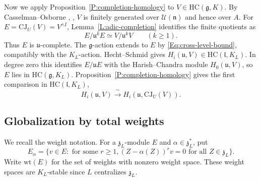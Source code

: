\documentclass[a4paper,12pt]{amsart}
\numberwithin{equation}{section}
\theoremstyle{plain}
\theoremstyle{definition}
\theoremstyle{remark}
\newcommand{\HC}{\mathrm{HC}}
\begin{document}
Now we apply Proposition~\ref{P:completion-homology} to $V\in\HC(\mathfrak g,K)$.
By Casselman--Osborne \cite{Casselman-Osborne}, \cite[Lemma~2.22]{HS83}, $V$ is finitely generated over $\mathcal U(\mathfrak n)$ and hence over $A$.
For $E=\mathrm{CJ}_U(V)=V^{\wedge I}$, Lemma~\ref{L:adic-completion} identifies the finite quotients as
\begin{equation}\label{Eq:CJ-algebraic-levels}
 E/\mathfrak u^kE\simeq V/\mathfrak u^kV\qquad(k\geq1).
\end{equation}
Thus $E$ is $\mathfrak u$-complete.
The $\mathfrak g$-action extends to $E$ by \eqref{Eq:cross-level-bound}, compatibly with the $K_L$-action.
Hecht--Schmid \cite[Proposition~2.24]{HS83} gives $H_i(\mathfrak u,V)\in\HC(\mathfrak l,K_L)$.
In degree zero this identifies $E/\mathfrak uE$ with the Harish--Chandra module $H_0(\mathfrak u,V)$, so $E$ lies in $\HC(\mathfrak g,K_L)$.
Proposition~\ref{P:completion-homology} gives the first comparison in $\HC(\mathfrak l,K_L)$,
\begin{equation}\label{Eq:algebraic-comparison}
 H_i(\mathfrak u,V)\xrightarrow{\ \sim\ }H_i(\mathfrak u,\mathrm{CJ}_U(V)).
\end{equation}

\subsection{Globalization by total weights}\label{S:complete-homology}
We recall the weight notation.
For a $\mathfrak z_L$-module $E$ and $\alpha\in\mathfrak z_L^*$, put
\[
 E_\alpha=\{v\in E:\text{ for some }r\geq1,
       (Z-\alpha(Z))^rv=0\text{ for all }Z\in\mathfrak z_L\}.
\]
Write $\mathrm{wt}(E)$ for the set of weights with nonzero weight space.
These weight spaces are $K_L$-stable since $L$ centralizes $\mathfrak z_L$.
\end{document}
